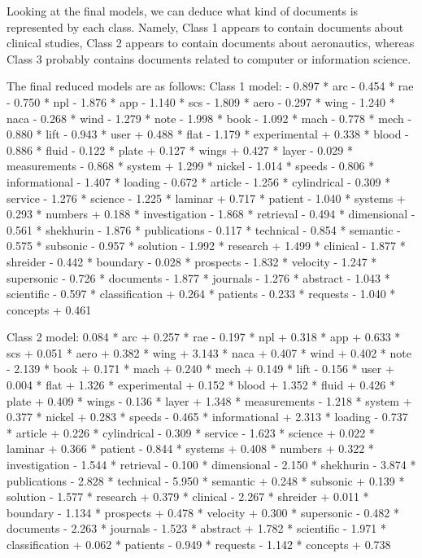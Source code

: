 Looking at the final models, we can deduce what kind of documents is represented by each class. Namely, Class 1 appears to contain documents about clinical studies, Class 2 appears to contain documents about aeronautics, whereas Class 3 probably contains documents related to computer or information science.

The final reduced models are as follows:
Class 1 model:
- 0.897 * arc - 0.454 * rae - 0.750 * npl - 1.876 * app - 1.140 * scs - 1.809 * aero - 0.297 * wing - 1.240 * naca - 0.268 * wind - 1.279 * note - 1.998 * book - 1.092 * mach - 0.778 * mech - 0.880 * lift - 0.943 * user + 0.488 * flat - 1.179 * experimental + 0.338 * blood - 0.886 * fluid - 0.122 * plate + 0.127 * wings + 0.427 * layer - 0.029 * measurements - 0.868 * system + 1.299 * nickel - 1.014 * speeds - 0.806 * informational - 1.407 * loading - 0.672 * article - 1.256 * cylindrical - 0.309 * service - 1.276 * science - 1.225 * laminar + 0.717 * patient - 1.040 * systems + 0.293 * numbers + 0.188 * investigation - 1.868 * retrieval - 0.494 * dimensional - 0.561 * shekhurin - 1.876 * publications - 0.117 * technical - 0.854 * semantic - 0.575 * subsonic - 0.957 * solution - 1.992 * research + 1.499 * clinical - 1.877 * shreider - 0.442 * boundary - 0.028 * prospects - 1.832 * velocity - 1.247 * supersonic - 0.726 * documents - 1.877 * journals - 1.276 * abstract - 1.043 * scientific - 0.597 * classification + 0.264 * patients - 0.233 * requests - 1.040 * concepts + 0.461

Class 2 model:
0.084 * arc + 0.257 * rae - 0.197 * npl + 0.318 * app + 0.633 * scs + 0.051 * aero + 0.382 * wing + 3.143 * naca + 0.407 * wind + 0.402 * note - 2.139 * book + 0.171 * mach + 0.240 * mech + 0.149 * lift - 0.156 * user + 0.004 * flat + 1.326 * experimental + 0.152 * blood + 1.352 * fluid + 0.426 * plate + 0.409 * wings - 0.136 * layer + 1.348 * measurements - 1.218 * system + 0.377 * nickel + 0.283 * speeds - 0.465 * informational + 2.313 * loading - 0.737 * article + 0.226 * cylindrical - 0.309 * service - 1.623 * science + 0.022 * laminar + 0.366 * patient - 0.844 * systems + 0.408 * numbers + 0.322 * investigation - 1.544 * retrieval - 0.100 * dimensional - 2.150 * shekhurin - 3.874 * publications - 2.828 * technical - 5.950 * semantic + 0.248 * subsonic + 0.139 * solution - 1.577 * research + 0.379 * clinical - 2.267 * shreider + 0.011 * boundary - 1.134 * prospects + 0.478 * velocity + 0.300 * supersonic - 0.482 * documents - 2.263 * journals - 1.523 * abstract + 1.782 * scientific - 1.971 * classification + 0.062 * patients - 0.949 * requests - 1.142 * concepts + 0.738

